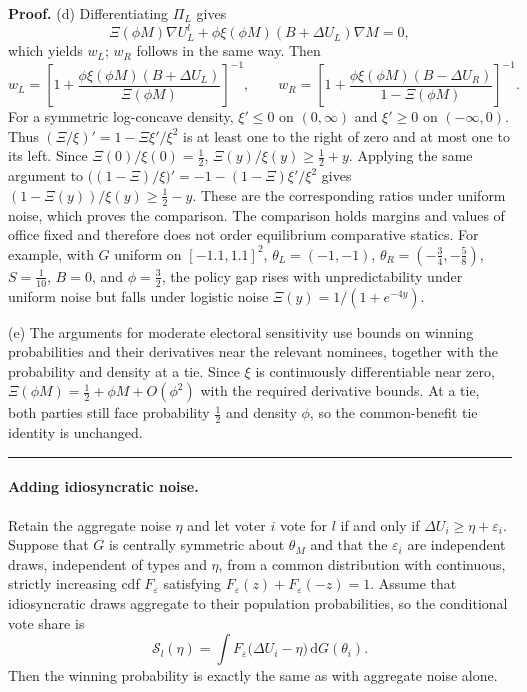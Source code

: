 \documentclass[12pt,letterpaper]{article}
\newenvironment{proof}[1][Proof]{\noindent\textbf{#1.} }{\ \rule{0.5em}{0.5em}}
\begin{document}
\begin{proof}
(d) Differentiating $\Pi_L$ gives
\[
\Xi(\phi M)\nabla U_L^l+\phi\xi(\phi M)(B+\Delta U_L)\nabla M=0,
\]
which yields $w_L$; $w_R$ follows in the same way. Then
\[
w_L=\left[1+\frac{\phi\xi(\phi M)(B+\Delta U_L)}{\Xi(\phi M)}\right]^{-1},
\qquad
w_R=\left[1+\frac{\phi\xi(\phi M)(B-\Delta U_R)}{1-\Xi(\phi M)}\right]^{-1}.
\]
For a symmetric log-concave density, $\xi'\le0$ on $(0,\infty)$ and $\xi'\ge0$ on $(-\infty,0)$. Thus $(\Xi/\xi)'=1-\Xi\xi'/\xi^2$ is at least one to the right of zero and at most one to its left. Since $\Xi(0)/\xi(0)=\tfrac12$, $\Xi(y)/\xi(y)\ge\tfrac12+y$. Applying the same argument to $\big((1-\Xi)/\xi\big)'=-1-(1-\Xi)\xi'/\xi^2$ gives $(1-\Xi(y))/\xi(y)\ge\tfrac12-y$. These are the corresponding ratios under uniform noise, which proves the comparison. The comparison holds margins and values of office fixed and therefore does not order equilibrium comparative statics. For example, with $G$ uniform on $[-1.1,1.1]^2$, $\theta_L=(-1,-1)$, $\theta_R=(-\tfrac34,-\tfrac58)$, $S=\tfrac1{10}$, $B=0$, and $\phi=\tfrac32$, the policy gap rises with unpredictability under uniform noise but falls under logistic noise $\Xi(y)=1/(1+e^{-4y})$.

(e) The arguments for moderate electoral sensitivity use bounds on winning probabilities and their derivatives near the relevant nominees, together with the probability and density at a tie. Since $\xi$ is continuously differentiable near zero, $\Xi(\phi M)=\tfrac12+\phi M+O(\phi^2)$ with the required derivative bounds. At a tie, both parties still face probability $\tfrac12$ and density $\phi$, so the common-benefit tie identity is unchanged.
\end{proof}

\paragraph{Adding idiosyncratic noise.}
Retain the aggregate noise $\eta$ and let voter $i$ vote for $l$ if and only if $\Delta U_i\ge\eta+\varepsilon_i$. Suppose that $G$ is centrally symmetric about $\theta_M$ and that the $\varepsilon_i$ are independent draws, independent of types and $\eta$, from a common distribution with continuous, strictly increasing cdf $F_\varepsilon$ satisfying $F_\varepsilon(z)+F_\varepsilon(-z)=1$. Assume that idiosyncratic draws aggregate to their population probabilities, so the conditional vote share is
\[
\mathcal S_l(\eta)=\int F_\varepsilon\big(\Delta U_i-\eta\big)\,\mathrm{d}G(\theta_i).
\]
Then the winning probability is exactly the same as with aggregate noise alone.
\end{document}
